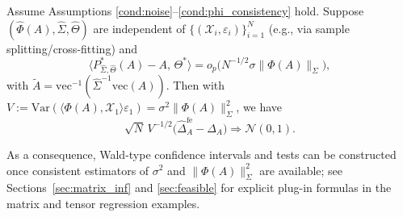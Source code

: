 \documentclass[authoryear,preprint,review,12pt]{elsarticle}
\begin{document}
	\begin{thm}
		\label{thm:asymp_normal_fe}
		Assume Assumptions \eqref{cond:noise}--\eqref{cond:phi_consistency} hold.
		Suppose $(\widehat{\Phi}(A),\widehat{\Sigma},\widehat{\Theta})$ are independent of
		$\{(\mathcal{X}_i,\varepsilon_i)\}_{i=1}^N$ (e.g., via sample splitting/cross-fitting) and
		\begin{equation} 
			\big\langle P_{\widehat{\Sigma},\widehat{\Theta}}^\ast(A)- A,\, \Theta^\ast\big\rangle 
			=o_p\!\big(N^{-1/2}\sigma\|\Phi(A)\|_\Sigma\big),
			\label{eq:feasible_remainder}
		\end{equation}
		with $\widetilde A = \mathrm{vec}^{-1}(\widehat\Sigma^{-1}\mathrm{vec}(A))$.
		Then with
		$V:=\mathrm{Var}(\langle \Phi(A),\mathcal{X}_1\rangle\varepsilon_1)
		=\sigma^2\|\Phi(A)\|_\Sigma^2$, we have
		\[
		\sqrt{N}\,V^{-1/2}\big(\widehat{\Delta}_A^{\mathrm{fe}} - {\Delta}_A\big)
		\Rightarrow \mathcal{N}(0,1).
		\]
	\end{thm} 
	As a consequence, Wald-type confidence intervals and tests can be constructed once consistent
	estimators of $\sigma^2$ and $\|\Phi(A)\|_\Sigma^2$ are available; see
	Sections~\ref{sec:matrix_inf} and \ref{sec:feasible} for explicit plug-in formulas in the matrix and tensor regression examples.
	
\end{document}
